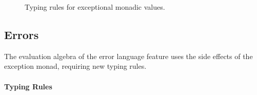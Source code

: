 
\begin{figure}
\caption{Typing rules for exceptional monadic values.}
\label{fig:WFM+Except}
\vspace{-.4cm}
\end{figure}

\subsection{Errors}

The evaluation algebra of the error language feature uses the side
effects of the exception monad, requiring new typing rules.

\paragraph{Typing Rules}

